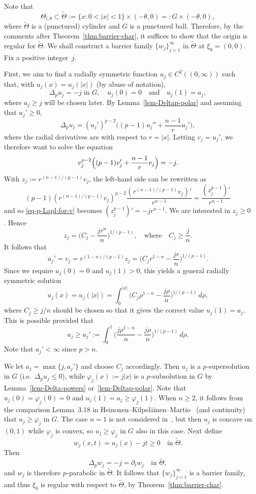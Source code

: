 \documentclass[a4paper, twoside]{article}
\makeatletter
\theoremstyle{propositional}
\theoremstyle{descriptive}
\renewenvironment{proof}[1][\proofname]{\par
  \pushQED{\qed}%
  \normalfont
  \trivlist
  \item[\hskip\labelsep
        \itshape
    #1\@addpunct{.}]\ignorespaces
}{%
  \popQED\endtrivlist\@endpefalse
}
\numberwithin{equation}{section}
\renewcommand{\phi}{\varphi}
\newcommand{\Thetat}{\widetilde{\Theta}}
\newcommand{\p}{{$p\mspace{1mu}$}}
\makeatother
\begin{document}
\begin{proof}[Proof of Proposition~\ref{prop-soda-p>n}]
Note that
\[
 \Theta_{l,\theta}  \subset 
   \Thetat  :=\{x : 0 < |x| < 1\} \times (-\theta,0)=: G \times (-\theta,0),
\]
where $\Thetat$ is a (punctured) cylinder and $G$ is a punctured ball.
Therefore, by the comments after Theorem~\ref{thm:barrier-char},
it suffices to show that the origin is regular for $\Thetat$.
We shall construct a barrier family $\{w_j\}_{j=1}^\infty$ in $\Thetat$
at $\xi_0=(0,0)$.
Fix a positive integer~$j$.

First, we aim to find a 
radially symmetric function $u_j\in C^2((0,\infty))$  
such that, with $u_j(x)=u_j(|x|)$ (by abuse of notation),
\[
\Delta_p u_j = -j 
\text{ in } G, \quad
u_j(0)=0
\quad \text{and} \quad  u_j(1)=a_j, 
\]
where $a_j \ge j$ will be chosen later.
By Lemma~\ref{lem-Deltap-polar} and assuming that $u_j'\ge0$,
\[
\Delta_p u_j = (u_j')^{p-2} \biggl( (p-1)u_j'' + \frac{n-1}{r} u_j' \biggr),
\]
where the radial derivatives are with respect to $r=|x|$.
Letting $v_j=u_j'$, we therefore want to solve the equation
\begin{equation}   \label{eq-p-Lapl-for-v}
v_j^{p-2} \Bigl( (p-1)v_j' + \frac{n-1}{r} v_j \Bigr) = -j. 
\end{equation}
With $z_j:=r^{(n-1)/(p-1)}v_j$, the left-hand side can be rewritten as
\[
(p-1) (r^{(n-1)/(p-1)}v_j)^{p-2} \frac{(r^{(n-1)/(p-1)} v_j)'}{r^{n-1}}
=\frac{(z_j^{p-1})'}{r^{n-1}}
\]
and so \eqref{eq-p-Lapl-for-v} becomes $(z_j^{p-1})' = -j r^{n-1}$.
We are interested in $z_j\ge0$. Hence
\[
z_j = \biggl( C_j - \frac{jr^n}{n} \biggr)^{1/(p-1)},
\quad \text{where}  \quad
C_j \ge  \frac{j}{n}. 
\]
It follows that
\[
u_j' = v_j = r^{(1-n)/(p-1)} z_j 
= \biggl( C_j r^{1-n} - \frac{jr}{n} \biggr)^{1/(p-1)}.
\]
Since we require $u_j(0)=0$ and $u_j(1)>0$, 
this yields a general radially symmetric solution
\[
u_j(x) = u_j(|x|) 
= \int_0^{|x|} \biggl( C_j \rho^{1-n} 
- \frac{j\rho}{n} \biggr)^{1/(p-1)}\,d\rho,
\]
where $C_j \ge j/n$
should be chosen so that it gives the correct value $u_j(1)=a_j$.
This is possible provided that
\[
   a_j \ge 
a_j':=\int_0^{1} \biggl( \frac{j\rho^{1-n}}{n} - \frac{j\rho}{n} \biggr)^{1/(p-1)}\,d\rho.
\]
Note that $a_j'<\infty$ since $p>n$.


We let $a_j=\max\{j,a_j'\}$ and choose $C_j$ accordingly.
Then $u_j$ is a \p-supersolution in $G$ (i.e.\ $\Delta_p u_j \le 0$),  while
$\phi_j(x):=j|x|$ 
is a \p-subsolution in $G$ by Lemma~\ref{lem-Delta-powers}
or~\ref{lem-Deltap-polar}.
Note that  $u_j(0)=\phi_j(0)=0$ 
and $u_j(1)=a_j \ge \phi_j(1)$. 
When $n \ge 2$, it follows from the comparison Lemma~3.18 in 
Heinonen--Kilpel\"ainen--Martio~\cite{HeKiMa} (and continuity)
that  $u_j \ge \phi_j$ in $G$.
The case $n=1$ is not considered in~\cite{HeKiMa},
but then
$u_j$ is concave on $(0,1)$ while $\phi_j$ is convex,
so $u_j \ge \phi_j$ in $G$ also in this case. 
Next define
\[
w_j(x,t)=u_j(x)-j t \ge 0
\quad \text{in } \Thetat.
\]
Then
\[
\Delta_p w_j
=-j=\partial_t w_j 
\quad \text{in } \Thetat, 
\]
and $w_j$ is therefore \p-parabolic in $\Thetat$. 
It follows that $\{w_j\}_{j=1}^\infty$
is a barrier family, and thus $\xi_0$ is regular with respect to $\Thetat$, 
by Theorem~\ref{thm:barrier-char}.
\end{proof}
\end{document}
